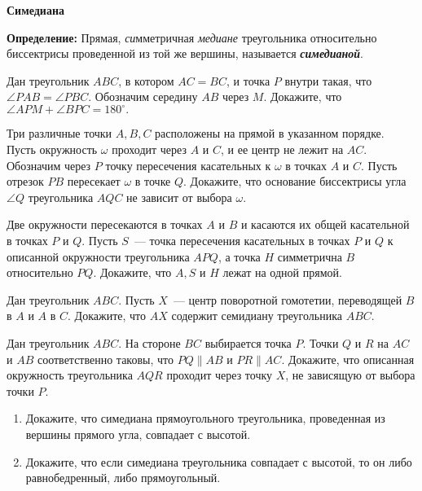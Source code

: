 \documentclass{article}
\begin{document}
    \large


    \begin{center}
        \textbf{Симедиана}
    \end{center}

    \textbf{Определение:} Прямая, \textit{си}мметричная \textit{медиане} треугольника относительно {биссектрисы} проведенной из той же вершины, называется \textit{\textbf{симедианой}}.


    \begin{enumerate_boxed}

        \item Дан треугольник $ ABC $, в котором $ AC = BC $, и точка $ P $ внутри такая, что $ \angle PAB = \angle PBC$.
        Обозначим середину $ AB $ через $ M $.
        Докажите, что $ \angle APM+\angle BPC=180^\circ.$

        \item Три различные точки $ A, B, C  $ расположены на прямой в указанном порядке.
        Пусть окружность $\omega$ проходит через $ A $ и $ C $, и ее центр не лежит на $ AC $.
        Обозначим через $ P $ точку пересечения касательных к $\omega$ в точках $ A $ и $ C $.
        Пусть отрезок $ PB $ пересекает $\omega$ в точке $ Q $.
        Докажите, что основание биссектрисы угла $ \angle Q $ треугольника $ AQC $ не зависит от выбора $\omega$.

        \item Две окружности пересекаются в точках $ A $ и $ B $ и касаются их общей касательной в точках $ P $ и $ Q $.
        Пусть $ S $~--- точка пересечения касательных в точках $ P $ и $ Q $ к описанной окружности треугольника $ AP Q $, а точка $ H $ симметрична $ B $ относительно $ P Q $.
        Докажите, что $ A, S $ и $ H $ лежат на одной прямой.

        \item  Дан треугольник $ ABC $.
        Пусть $ X $~--- центр поворотной гомотетии, переводящей $ B $ в $ A $ и $ A $ в $ C $.
        Докажите, что $ AX $ содержит семидиану треугольника $ ABC $.

        \item Дан треугольник $ ABC $.
        На стороне $ BC $ выбирается точка $ P $.
        Точки $ Q $ и $ R $ на $ AC $ и $ AB $ соответственно таковы, что $ PQ \parallel AB$  и  $PR \parallel AC$.
        Докажите, что описанная окружность треугольника $ AQR $ проходит через точку $ X $, не зависящую от выбора точки $ P $.

        \begin{enumerate}
            \item Докажите, что симедиана прямоугольного треугольника, проведенная из вершины прямого угла, совпадает с высотой.
            \item Докажите, что если симедиана треугольника совпадает с высотой, то он либо равнобедренный, либо прямоугольный.
        \end{enumerate}



\end{enumerate_boxed}
\end{document}
